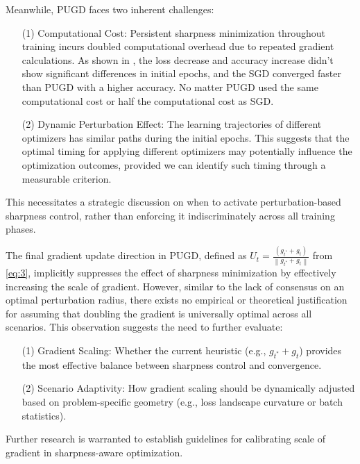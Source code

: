 \documentclass[10pt,twocolumn,letterpaper]{article}
\begin{document}
Meanwhile, PUGD faces two inherent challenges:
\begin{enumerate}
    \item[(1)] Computational Cost: Persistent sharpness minimization throughout training incurs doubled computational overhead due to repeated gradient calculations. As shown in , the loss decrease and accuracy increase didn't show significant differences in initial epochs, and the SGD converged faster than PUGD with a higher accuracy. No matter PUGD used the same computational cost or half the computational cost as SGD.
	\item[(2)] Dynamic Perturbation Effect: The learning trajectories of different optimizers has similar paths during the initial epochs\cite{Tseng_2022}. This suggests that the optimal timing for applying different optimizers may potentially influence the optimization outcomes, provided we can identify such timing through a measurable criterion.
\end{enumerate}
This necessitates a strategic discussion on when to activate perturbation-based sharpness control, rather than enforcing it indiscriminately across all training phases.

The final gradient update direction in PUGD, defined as $U_t = \frac{(g_{t^{*}} + g_t)}{\left \|g_{t^{*}} + g_t\right \| }$ from \eqref{eq:3}, implicitly suppresses the effect of sharpness minimization by effectively increasing the scale of gradient. However, similar to the lack of consensus on an optimal perturbation radius, there exists no empirical or theoretical justification for assuming that doubling the gradient is universally optimal across all scenarios. This observation suggests the need to further evaluate:
\begin{enumerate}
    \item[(1)] Gradient Scaling: Whether the current heuristic (e.g., $g_{t^{*}} + g_t$) provides the most effective balance between sharpness control and convergence.
    \item[(2)] Scenario Adaptivity: How gradient scaling should be dynamically adjusted based on problem-specific geometry (e.g., loss landscape curvature or batch statistics).
\end{enumerate}
Further research is warranted to establish guidelines for calibrating scale of gradient in sharpness-aware optimization.
\end{document}
